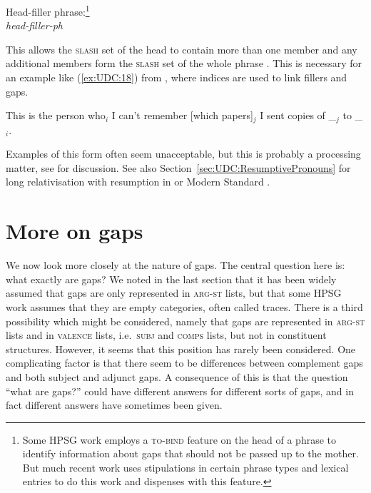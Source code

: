 \documentclass[output=paper
,notxmath 
 	        ,biblatex
                ,babelshorthands
                ,newtxmath
                ,draftmode
                ,colorlinks, citecolor=brown
]{langscibook}
\begin{document}
\eas
\label{fig:UDC:17}
Head-filler phrase:\footnote{Some HPSG work employs a \textsc{to-bind} feature
  on the head of a phrase to identify information about gaps that
  should not be passed up to the mother. But much recent work uses
  stipulations in certain phrase types and lexical entries to do this
  work and dispenses with this feature.

}\\
\emph{head-filler-ph} \impl\\
\zs

\noindent
This allows the \textsc{slash} set of the head to contain more than one member
and any additional members form the \textsc{slash} set of the whole phrase . This
is necessary for an example like (\ref{ex:UDC:18}) from \citet[473]{Chaves:12}, where indices
are used to link fillers and gaps.

\ea
\label{ex:UDC:18}
This is the person who$_i$ I can't remember [which papers]$_j$ I sent copies of \_$_j$ to \_$_i$.
\z

\noindent
Examples of this form often seem unacceptable, but this is probably a
processing matter, see \citet[Section~3]{Chaves:12} for discussion.
See also Section~\ref{sec:UDC:ResumptivePronouns} for long
relativisation with resumption in  or Modern Standard .

\section{More on gaps}
\label{sec:UDC:MoreOnGaps}


We now look more closely at the nature of gaps. The central question
here is: what exactly are gaps? We noted in the last section that it
has been widely assumed that gaps are only represented in
\textsc{arg-st} lists, but that some HPSG work assumes that they are
empty categories, often called traces. There is a third possibility
which might be considered, namely that gaps are represented in
\textsc{arg-st} lists and in \textsc{valence} lists,
i.e.\ \textsc{subj} and \textsc{comps} lists, but not in constituent
structures. However, it seems that this position has rarely been
considered. One complicating factor is that there seem to be
differences between complement gaps and both subject and adjunct
gaps. A consequence of this is that the question ``what are gaps?''
could have different answers for different sorts of gaps, and in fact
different answers have sometimes been given.
\end{document}
